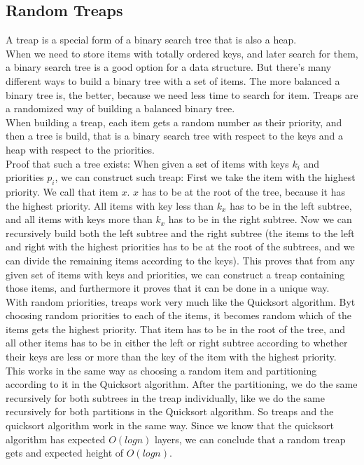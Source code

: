 \documentclass[12pt]{article}
\begin{document}
\subsection*{Random Treaps}
A treap is a special form of a binary search tree that is also a heap.\\
When we need to store items with totally ordered keys, and later search for them, a binary search tree is a good option for a data structure. But there's many different ways to build a binary tree with a set of items. The more balanced a binary tree is, the better, because we need less time to search for item. Treaps are a randomized way of building a balanced binary tree.\\
When building a treap, each item gets a random number as their priority, and then a tree is build, that is a binary search tree with respect to the keys and a heap with respect to the priorities.\\
Proof that such a tree exists: When given a set of items with keys $k_i$ and priorities $p_i$, we can construct such treap: First we take the item with the highest priority. We call that item $x$. $x$ has to be at the root of the tree, because it has the highest priority. All items with key less than $k_x$ has to be in the left subtree, and all items with keys more than $k_x$ has to be in the right subtree. Now we can recursively build both the left subtree and the right subtree (the items to the left and right with the highest priorities has to be at the root of the subtrees, and we can divide the remaining items according to the keys). This proves that from any given set of items with keys and priorities, we can construct a treap containing those items, and furthermore it proves that it can be done in a unique way.\\
With random priorities, treaps work very much like the Quicksort algorithm. Byt choosing random priorities to each of the items, it becomes random which of the items gets the highest priority. That item has to be in the root of the tree, and all other items has to be in either the left or right subtree according to whether their keys are less or more than the key of the item with the highest priority. This works in the same way as choosing a random item and partitioning according to it in the Quicksort algorithm. After the partitioning, we do the same recursively for both subtrees in the treap individually, like we do the same recursively for both partitions in the Quicksort algorithm. So treaps and the quicksort algorithm work in the same way. Since we know that the quicksort algorithm has expected $O(logn)$ layers, we can conclude that a random treap gets and expected height of $O(logn)$.\\
\end{document}
